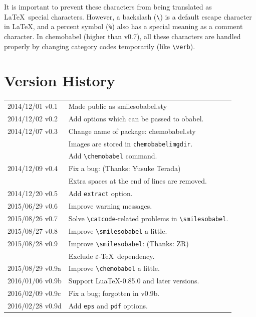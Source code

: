\documentclass[12pt]{ltjsarticle}
\def\Lpack#1{\textsf{#1}}
\def\Lcode#1{\texttt{#1}}
\begin{document}
It is important to prevent these characters from being translated as
\LaTeX\ special characters.
However, a backslash (\verb|\|) is a default escape character in \LaTeX,
and a percent symbol (\verb|%|) also has a special meaning as a comment character.
In \Lpack{chemobabel} (higher than v0.7), all these characters are
handled properly by changing category codes temporarily (like \verb+\verb+). \\

\clearpage

\section{Version History}

\begin{table}[h]
\centering
\begin{tabular}{ll}
2014/12/01 v0.1  & Made public as \Lpack{smilesobabel.sty} \\
2014/12/02 v0.2  & Add options which can be passed to obabel. \\
2014/12/07 v0.3  & Change name of package: \Lpack{chemobabel.sty} \\
                 & Images are stored in \Lcode{chemobabelimgdir}. \\
                 & Add \verb|\chemobabel| command. \\
2014/12/09 v0.4  & Fix a bug: (Thanks: Yusuke Terada) \\
                 & Extra spaces at the end of lines are removed. \\
2014/12/20 v0.5  & Add \verb|extract| option. \\
2015/06/29 v0.6  & Improve warning messages. \\
2015/08/26 v0.7  & Solve \verb|\catcode|-related problems in \verb|\smilesobabel|. \\
2015/08/27 v0.8  & Improve \verb|\smilesobabel| a little. \\
2015/08/28 v0.9  & Improve \verb|\smilesobabel|: (Thanks: ZR) \\
                 & Exclude $\varepsilon$-\TeX\ dependency. \\
2015/08/29 v0.9a & Improve \verb|\chemobabel| a little. \\
2016/01/06 v0.9b & Support Lua\TeX-0.85.0 and later versions. \\
2016/02/09 v0.9c & Fix a bug; forgotten in v0.9b. \\
2016/02/28 v0.9d & Add \verb|eps| and \verb|pdf| options. \\

\end{tabular}
\end{table}
\end{document}
